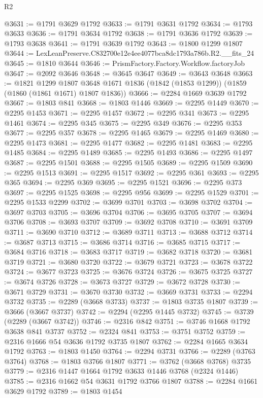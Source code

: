 \begin{lexlean}{R2}
\begin{coremodule}
@3631 := @1791 @3629 @1792
@3633 := @1791 @3631 @1792
@3634 := @1793 @3633
@3636 := @1791 @3634 @1792
@3638 := @1791 @3636 @1792
@3639 := @1793 @3638
@3641 := @1791 @3639 @1792
@3643 := @1800 @1299 @1807
@3644 := LexLeanPreserve.C832700e12e4ee4077bca8dc1793a786b.R2.__fits_24
@3645 := @1810 @3644
@3646 := PrismFactory.Factory.Workflow.factoryJob
@3647 := @2092 @3646
@3648 := @3645 @3647
@3649 := @3643 @3648
@3663 := @1821
    @1299
    @1807
    @3648
    @1671
    @1836
    (@1842 (@1853 @1299))
    (@1859 (@1860 (@1861 @1671) @1807 @1836))
@3666 := @2284 @1669 @3639 @1792
@3667 := @1803 @841
@3668 := @1803 @1446
@3669 := @2295 @1449
@3670 := @2295 @1453
@3671 := @2295 @1457
@3672 := @2295 @341
@3673 := @2295 @1461
@3674 := @2295 @345
@3675 := @2295 @349
@3676 := @2295 @353
@3677 := @2295 @357
@3678 := @2295 @1465
@3679 := @2295 @1469
@3680 := @2295 @1473
@3681 := @2295 @1477
@3682 := @2295 @1481
@3683 := @2295 @1485
@3684 := @2295 @1489
@3685 := @2295 @1493
@3686 := @2295 @1497
@3687 := @2295 @1501
@3688 := @2295 @1505
@3689 := @2295 @1509
@3690 := @2295 @1513
@3691 := @2295 @1517
@3692 := @2295 @361
@3693 := @2295 @365
@3694 := @2295 @369
@3695 := @2295 @1521
@3696 := @2295 @373
@3697 := @2295 @1525
@3698 := @2295 @956
@3699 := @2295 @1529
@3701 := @2295 @1533 @2299
@3702 := @3699 @3701
@3703 := @3698 @3702
@3704 := @3697 @3703
@3705 := @3696 @3704
@3706 := @3695 @3705
@3707 := @3694 @3706
@3708 := @3693 @3707
@3709 := @3692 @3708
@3710 := @3691 @3709
@3711 := @3690 @3710
@3712 := @3689 @3711
@3713 := @3688 @3712
@3714 := @3687 @3713
@3715 := @3686 @3714
@3716 := @3685 @3715
@3717 := @3684 @3716
@3718 := @3683 @3717
@3719 := @3682 @3718
@3720 := @3681 @3719
@3721 := @3680 @3720
@3722 := @3679 @3721
@3723 := @3678 @3722
@3724 := @3677 @3723
@3725 := @3676 @3724
@3726 := @3675 @3725
@3727 := @3674 @3726
@3728 := @3673 @3727
@3729 := @3672 @3728
@3730 := @3671 @3729
@3731 := @3670 @3730
@3732 := @3669 @3731
@3733 := @2294 @3732
@3735 := @2289 (@3668 @3733)
@3737 := @1803 @3735 @1807
@3739 := @3666 (@3667 @3737)
@3742 := @2294 (@2295 @1445 @3732)
@3745 := @3739 (@2289 (@3667 @3742))
@3746 := @2316 @842
@3751 := @3746 @1668 @1792 @3638 @841 @3737
@3752 := @2324 @841
@3753 := @3751 @3752
@3759 := @2316 @1666 @54 @3636 @1792 @3735 @1807
@3762 := @2284 @1665 @3634 @1792
@3763 := @1803 @1450
@3764 := @2294 @3731
@3766 := @2289 (@3763 @3764)
@3768 := @1803 @3766 @1807
@3771 := @3762 (@3668 @3768) @3735
@3779 := @2316 @1447 @1664 @1792 @3633 @1446 @3768 (@2324 @1446)
@3785 := @2316 @1662 @54 @3631 @1792 @3766 @1807
@3788 := @2284 @1661 @3629 @1792
@3789 := @1803 @1454

\end{coremodule}
\end{lexlean}
